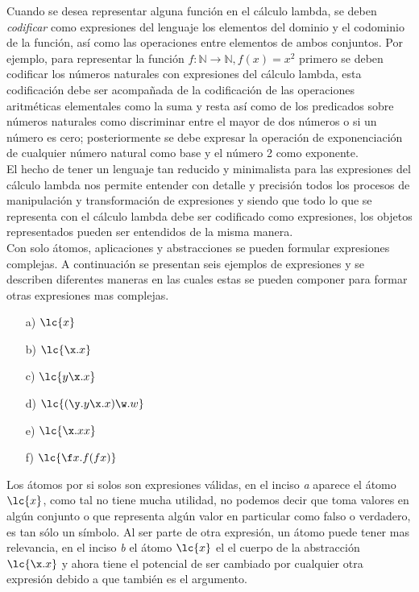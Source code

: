 Cuando se desea representar alguna función en el cálculo lambda, se deben
\emph{codificar} como expresiones del lenguaje los elementos del dominio y el
codominio de la función, así como las operaciones entre elementos de ambos
conjuntos. Por ejemplo, para representar la función \(f : \mathbb{N} \to
\mathbb{N}, f(x)=x^{2}\) primero se deben codificar los números naturales con
expresiones del cálculo lambda, esta codificación debe ser acompañada de la
codificación de las operaciones aritméticas elementales como la suma y resta así
como de los predicados sobre números naturales como discriminar entre el mayor
de dos números o si un número es cero; posteriormente se debe expresar la
operación de exponenciación de cualquier número natural como base y el número 2
como exponente. \\

El hecho de tener un lenguaje tan reducido y minimalista para las expresiones
del cálculo lambda nos permite entender con detalle y precisión todos los
procesos de manipulación y transformación de expresiones y siendo que todo lo
que se representa con el cálculo lambda debe ser codificado como expresiones,
los objetos representados pueden ser entendidos de la misma manera. \\

Con solo átomos, aplicaciones y abstracciones se pueden formular expresiones
complejas. A continuación se presentan seis ejemplos de expresiones y se
describen diferentes maneras en las cuales estas se pueden componer para formar
otras expresiones mas complejas. \\

\begin{itemize}
\item[a)] \(\lc{x}\)
\item[b)] \(\lc{\x.x}\)
\item[c)] \(\lc{y\x.x}\)
\item[d)] \(\lc{(\y.y\x.x)\w.w}\)
\item[e)] \(\lc{\x.x x}\)
\item[f)] \(\lc{\f x.f(f x)}\)
\end{itemize}

Los átomos por si solos son expresiones válidas, en el inciso \emph{a} aparece
el átomo \(\lc{x}\), como tal no tiene mucha utilidad, no podemos decir que toma
valores en algún conjunto o que representa algún valor en particular como falso
o verdadero, es tan sólo un símbolo. Al ser parte de otra expresión, un átomo
puede tener mas relevancia, en el inciso \emph{b} el átomo \(\lc{x}\) el el
cuerpo de la abstracción \(\lc{\x.x}\) y ahora tiene el potencial de ser
cambiado por cualquier otra expresión debido a que también es el argumento. \\

